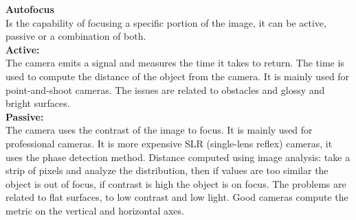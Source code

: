 \textbf{Autofocus}
\\Is the capability of focusing a specific portion of the image, it can be active, passive or a combination of both.
\\\textbf{Active:}  
\\The camera emits a signal and measures the time it takes to return. The time is used to compute the distance of the object from the camera.
It is mainly used for point-and-shoot cameras. The issues are related to obstacles and glossy and bright surfaces.
\\\textbf{Passive:}
\\The camera uses the contrast of the image to focus. It is mainly used for professional cameras. 
It is more expensive SLR (single-lens reflex) cameras, it uses the phase detection method.
Distance computed using image analysis: take a strip of pixels and analyze the distribution, then if values are too similar the object is out of focus, if contrast is high the object is on focus.
The problems are related to flat surfaces, to low contrast and low light.
Good cameras compute the metric on the vertical and horizontal axes.
